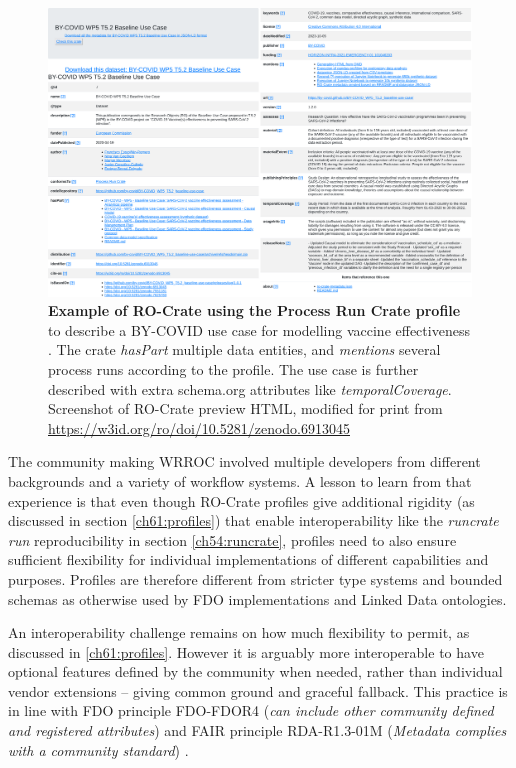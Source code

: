 \begin{landscape}
\begin{figure}[p]
  \includegraphics[height=\textheight]{figures/ch09/baseline-usecase.pdf}
  
    \caption[Example of RO-Crate using the Process Run Crate profile]{\footnotesize \textbf{Example of RO-Crate using the Process Run Crate profile} to
    describe a BY-COVID use case for modelling vaccine effectiveness \cite{Meurisse 2023}.
    The crate \emph{hasPart} multiple data entities, and \emph{mentions} several process runs according to the profile. The use case is further described with extra schema.org attributes like \emph{temporalCoverage}. Screenshot of RO-Crate preview HTML, modified for print from \url{https://w3id.org/ro/doi/10.5281/zenodo.6913045}
    }
  \label{ch61:fig:baseline-usecase}
\end{figure}
\end{landscape}

The community making WRROC involved multiple developers from different backgrounds and a variety of workflow systems. 
A lesson to learn from that experience is that even though RO-Crate profiles give additional rigidity (as discussed in section \vref{ch61:profiles}) that enable interoperability like the \emph{runcrate run} reproducibility in section \vref{ch54:runcrate}, profiles need to also ensure sufficient flexibility for individual implementations of different capabilities and purposes.
Profiles are therefore different from stricter type systems and bounded schemas as otherwise used by FDO implementations and Linked Data ontologies.

An interoperability challenge remains on how much flexibility to permit, as discussed in \vref{ch61:profiles}. However it is arguably more interoperable to have optional features defined by the community when needed, rather than individual vendor extensions -- giving common ground and graceful fallback. This practice is in line with FDO principle FDO-FDOR4 (\emph{can include other community defined and registered attributes}) \cite{fdo-RequirementSpec} and FAIR principle RDA-R1.3-01M (\emph{Metadata complies with a community standard}) \cite{groupFAIRDataMaturity2020}.


